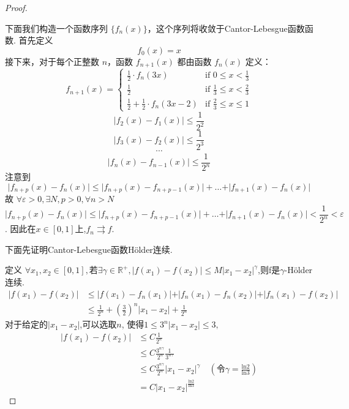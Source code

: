 \documentclass[hyperref,a4paper,UTF8]{ctexart}
\begin{document}
\begin{proof}
\begin{figure}[htbp]
\begin{minipage}{0.3\textwidth}
  \end{minipage}
\end{figure}
下面我们构造一个函数序列 $\{f_n(x)\}$，这个序列将收敛于Cantor-Lebesgue函数函数.
首先定义
\[
f_0(x) = x
\]
接下来，对于每个正整数 $n$，函数 $f_{n+1}(x)$ 都由函数 $f_n(x)$ 定义：
\[
f_{n+1}(x) = 
\begin{cases}
    \frac{1}{2} \cdot f_n(3x) & \text{if } 0 \leqslant x < \frac{1}{3} \\
    \frac{1}{2} & \text{if } \frac{1}{3} \leqslant x < \frac{2}{3} \\
    \frac{1}{2} + \frac{1}{2} \cdot f_n(3x-2) & \text{if } \frac{2}{3} \leqslant x \leqslant 1
\end{cases}
\]
\[
 \vert f_2(x) - f_1(x) \vert \leqslant \frac{1}{2^2}
\]
\[
 \vert f_3(x) - f_2(x) \vert \leqslant \frac{1}{2^3}
\]
\[
  \cdots
\]
\[
 \vert f_n(x) - f_{n-1}(x) \vert \leqslant \frac{1}{2^n}
\]
注意到
$$\vert f_{n+p}(x) - f_{n}(x) \vert \leqslant  \vert f_{n+p}(x) - f_{n+p-1}(x) \vert + \dots +\vert f_{n+1}(x) - f_{n}(x) \vert$$
故
$\forall \varepsilon > 0,\exists N,p > 0,\forall n > N$
$$\vert f_{n+p}(x) - f_{n}(x) \vert \leqslant  \vert f_{n+p}(x) - f_{n+p-1}(x) \vert + \dots +\vert f_{n+1}(x) - f_{n}(x) \vert < \frac{1}{2^n} < \varepsilon$$. 
因此在$x \in [0,1]$上,$f_n \rightrightarrows f$. 

下面先证明Cantor-Lebesgue函数Hölder连续. 

定义
$\forall x_1, x_2 \in [0,1] , \text{若}\exists \gamma \in \mathbb{R}^+,\vert f(x_1) - f(x_2) \vert \le M \vert x_1-x_2 \vert^\gamma$,则f是$\gamma$-Hölder连续.  
\begin{align*}
  \vert f(x_1) - f(x_2) \vert &\le \vert f(x_1) - f_n(x_1) \vert+\vert f_n(x_1) - f_n(x_2) \vert+\vert f_n(x_1) - f(x_2) \vert\\
  &\le \frac{1}{2^n}+ \left(\frac{3}{2}\right)^n \vert x_1-x_2 \vert + \frac{1}{2^n}
\end{align*}
对于给定的$\vert x_1-x_2 \vert$,可以选取$n$, $\text{使得} 1 \leqslant 3^n\vert x_1-x_2 \vert \leqslant 3,$
\begin{align*}
\vert f(x_1) - f(x_2) \vert &\leqslant C \frac{1}{2^n} \\
&\leqslant C \frac{3^{n\gamma}}{2^n}\frac{1}{3^{n\gamma}}\\
&\leqslant C \frac{3^{n\gamma}}{2^n} \vert x_1-x_2 \vert^\gamma \quad (\text{令}\gamma = \frac{\mathrm{ln}2}{\mathrm{ln}3}) \\
& = C\vert x_1-x_2 \vert^{\frac{\mathrm{ln}2}{\mathrm{ln}3}}
\end{align*}


\end{proof}
\end{document}
